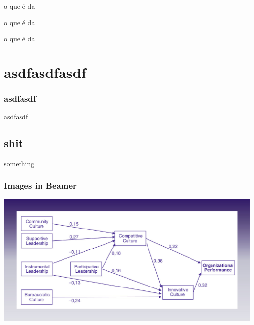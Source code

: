 \begin{frame}

\begin{block}{o que é}
da
\end{block}
\begin{alertblock}{o que é}
da
\end{alertblock}
\begin{exampleblock}{o que é}
da
\end{exampleblock}

\end{frame}

\section{asdfasdfasdf}

\begin{frame}
\frametitle{asdfasdf}

asdfasdf

\end{frame}

\subsection{shit}
something

\begin{frame}
\frametitle{Images in Beamer}

\includegraphics[scale=.25]{"./image/OB/Ogbonna & Harris.jpg"}

\end{frame}

